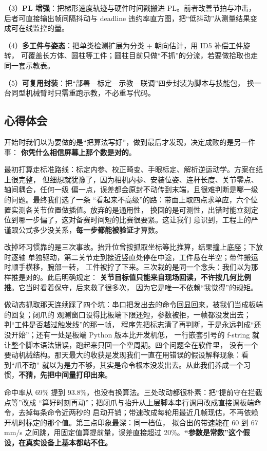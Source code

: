 \documentclass[UTF8,a4paper,zihao=5,fontset=windows]{ctexart}
\begin{document}
（3）\textbf{PL 增强}：把梯形速度轨迹与硬件时间戳搬进 PL。前者改善节拍与冲击，
后者可直接输出帧间隔抖动与 deadline 违约率直方图，把“低抖动”从测量结果变成可在线监控的量。

（4）\textbf{多工件与姿态}：把单类检测扩展为分类 + 朝向估计，用 ID5 补偿工件旋转，
可覆盖长方体、圆柱等工件；圆柱目前只做“不抓”的分流，若要做拾取也走同一套示教表。

（5）\textbf{可复用封装}：把“部署—标定—示教—联调”四步封装为脚本与技能包，
换一台同型机械臂时只需重跑示教，不必重写代码。

\subsection{心得体会}

开始时我们以为要做的是“把算法写好”，做到最后才发现，决定成败的是另一件事：
\textbf{你凭什么相信屏幕上那个数是对的}。

最初打算走标准路线：标定内参、校正畸变、手眼标定、解析逆运动学。方案在纸上很完整，
但细想就犹豫了，因为相机内参、安装位姿、连杆长度、关节零点、轴间耦合，任何一级
偏一点，误差都会原封不动传到末端，且很难判断是哪一级的问题。最终我们选了一条
“看起来不高级”的路：带面上取四点求单应，六个位置实测各关节位置做插值。放弃的是通用性，
换回的是可测性，出错时能立刻定位到哪一步偏了，这对备赛时间短的比赛很要紧。这让我们
意识到，工程上的严谨跟公式多少没关系，\textbf{每一步都能被验证}才算数。

改掉坏习惯靠的是三次事故。抬升位曾按抓取坐标等比推算，结果撞上底座；下放时逐轴
单独驱动，第二关节走到接近竖直处停在中途，工件悬在半空；带件搬运时顺手横移，腕部一转，
工件被拧了下来。三次栽的是同一个念头：我们以为那样推是对的。此后明确规定：
\textbf{关节目标值只能来自现场回读，不许按几何比例推}。它当时看着保守，后来救了很多次，
因为它是唯一不依赖“我觉得”的规矩。

做动态抓取那天连续踩了四个坑：串口把发出去的命令回显回来，被我们当成板端的回复；闭爪的
观测窗口设得比板端下限还短，参数被拒，一帧都没发出去；判“工件是否越过触发线”的那一帧，
程序先把标志清了再判断，于是永远判成“还没开始”；还有一处是板端 Python 版本比开发机低，
一行嵌套引号的 f-string 就让整个脚本语法错误，跑起来只回一个空周期。四个问题全在软件里，
没有一个要动机械结构。那天最大的收获是发现我们一直在用错误的假设解释现象：看到“爪不动”
就以为是力不够，其实是命令根本没发出去。从此我们养成一个习惯，\textbf{不猜，先把中间量打印出来}。

命中率从 69\% 提到 93.8\%，也没有换算法。三处改动都很朴素：把“提前守在拦截点等”改成
“算好时刻再动”；把闭爪与抬升从上层脚本串行调用改成直接调板端命令，去掉每条命令近两秒的
启动开销；带速改成每轮用最近几帧现估，不再依赖开机时标定的那个值。第三点印象最深：同一档位，
拟合出的带速能在 60 到 67\,mm/s 之间跳，用固定值算提前量，误差直接超过 20\%。\textbf{“参数是常数”这个假设，在真实设备上基本都站不住。}
\end{document}
